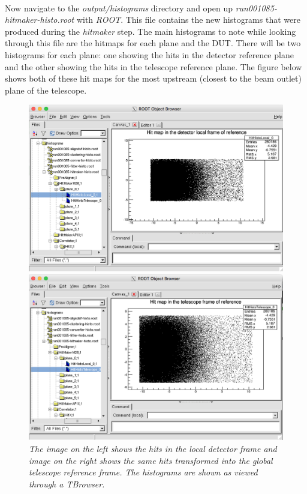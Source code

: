 \documentclass[11pt]{article}
\begin{document}
\paragraph{}
Now navigate to the \textit{output/histograms} directory and open up \textit{run001085-hitmaker-histo.root} with \textit{ROOT}. This file contains the new histograms that were produced during the \textit{hitmaker} step. The main histograms to note while looking through this file are the hitmaps for each plane and the DUT. There will be two histograms for each plane: one showing the hits in the detector reference plane and the other showing the hits in the telescope reference plane. The figure below shows both of these hit maps for the most upstream (closest to the beam outlet) plane of the telescope.
\newpage
\begin{figure}[h!]
	\begin{minipage}{0.5\textwidth}
		\centering
		\includegraphics[scale=0.3]{images/hitmaker_local.png}
	\end{minipage}
    \begin{minipage}{0.5\textwidth}
		\centering
		\includegraphics[scale=0.3]{images/hitmaker_telescope.png}
	\end{minipage}
	\caption{\textit{The image on the left shows the hits in the local detector frame and image on the right shows the same hits transformed into the global telescope reference frame. The histograms are shown as viewed through a TBrowser.}}
    \label{HVSV1}
\end{figure}
\end{document}
